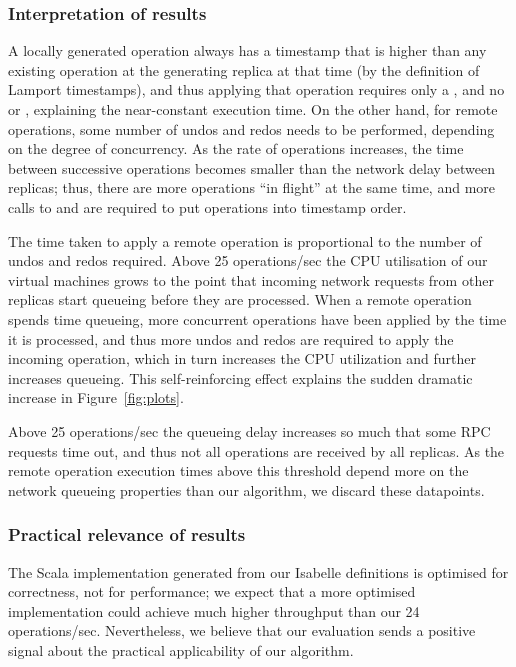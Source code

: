 \documentclass[sigconf]{acmart}
\begin{document}
\subsubsection{Interpretation of results}

A locally generated operation always has a timestamp that is higher than any existing operation at the generating replica at that time (by the definition of Lamport timestamps), and thus applying that operation requires only a , and no  or , explaining the near-constant execution time.
On the other hand, for remote operations, some number of undos and redos needs to be performed, depending on the degree of concurrency.
As the rate of operations increases, the time between successive operations becomes smaller than the network delay between replicas; thus, there are more operations ``in flight'' at the same time, and more calls to  and  are required to put operations into timestamp order.

The time taken to apply a remote operation is proportional to the number of undos and redos required.
Above 25 operations/sec the CPU utilisation of our virtual machines grows to the point that incoming network requests from other replicas start queueing before they are processed.
When a remote operation spends time queueing, more concurrent operations have been applied by the time it is processed, and thus more undos and redos are required to apply the incoming operation, which in turn increases the CPU utilization and further increases queueing.
This self-reinforcing effect explains the sudden dramatic increase in Figure~\ref{fig:plots}.

Above 25 operations/sec the queueing delay increases so much that some RPC requests time out, and thus not all operations are received by all replicas.
As the remote operation execution times above this threshold depend more on the network queueing properties than our algorithm, we discard these datapoints.

\subsubsection{Practical relevance of results}

The Scala implementation generated from our Isabelle definitions is optimised for correctness, not for performance; we expect that a more optimised implementation could achieve much higher throughput than our 24 operations/sec.
Nevertheless, we believe that our evaluation sends a positive signal about the practical applicability of our algorithm.
\end{document}
